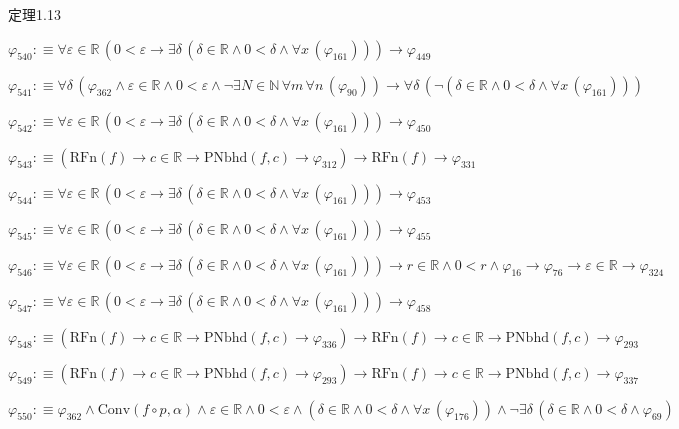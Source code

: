 \begin{fullproof}{定理1.13}
\begin{abbrevlist}
\item $\varphi_{540} :\equiv \forall \varepsilon \in \mathbb{R}\,(0 < \varepsilon \to \exists \delta\,(\delta \in \mathbb{R} \land 0 < \delta \land \forall x\,(\varphi_{161}))) \to \varphi_{449}$
\item $\varphi_{541} :\equiv \forall \delta\,(\varphi_{362} \land \varepsilon \in \mathbb{R} \land 0 < \varepsilon \land \neg \exists N \in \mathbb{N}\,\forall m\,\forall n\,(\varphi_{90})) \to \forall \delta\,(\neg (\delta \in \mathbb{R} \land 0 < \delta \land \forall x\,(\varphi_{161})))$
\item $\varphi_{542} :\equiv \forall \varepsilon \in \mathbb{R}\,(0 < \varepsilon \to \exists \delta\,(\delta \in \mathbb{R} \land 0 < \delta \land \forall x\,(\varphi_{161}))) \to \varphi_{450}$
\item $\varphi_{543} :\equiv (\mathrm{RFn}(f) \to c \in \mathbb{R} \to \mathrm{PNbhd}(f,c) \to \varphi_{312}) \to \mathrm{RFn}(f) \to \varphi_{331}$
\item $\varphi_{544} :\equiv \forall \varepsilon \in \mathbb{R}\,(0 < \varepsilon \to \exists \delta\,(\delta \in \mathbb{R} \land 0 < \delta \land \forall x\,(\varphi_{161}))) \to \varphi_{453}$
\item $\varphi_{545} :\equiv \forall \varepsilon \in \mathbb{R}\,(0 < \varepsilon \to \exists \delta\,(\delta \in \mathbb{R} \land 0 < \delta \land \forall x\,(\varphi_{161}))) \to \varphi_{455}$
\item $\varphi_{546} :\equiv \forall \varepsilon \in \mathbb{R}\,(0 < \varepsilon \to \exists \delta\,(\delta \in \mathbb{R} \land 0 < \delta \land \forall x\,(\varphi_{161}))) \to r \in \mathbb{R} \land 0 < r \land \varphi_{16} \to \varphi_{76} \to \varepsilon \in \mathbb{R} \to \varphi_{324}$
\item $\varphi_{547} :\equiv \forall \varepsilon \in \mathbb{R}\,(0 < \varepsilon \to \exists \delta\,(\delta \in \mathbb{R} \land 0 < \delta \land \forall x\,(\varphi_{161}))) \to \varphi_{458}$
\item $\varphi_{548} :\equiv (\mathrm{RFn}(f) \to c \in \mathbb{R} \to \mathrm{PNbhd}(f,c) \to \varphi_{336}) \to \mathrm{RFn}(f) \to c \in \mathbb{R} \to \mathrm{PNbhd}(f,c) \to \varphi_{293}$
\item $\varphi_{549} :\equiv (\mathrm{RFn}(f) \to c \in \mathbb{R} \to \mathrm{PNbhd}(f,c) \to \varphi_{293}) \to \mathrm{RFn}(f) \to c \in \mathbb{R} \to \mathrm{PNbhd}(f,c) \to \varphi_{337}$
\item $\varphi_{550} :\equiv \varphi_{362} \land \mathrm{Conv}(f \circ p,\alpha) \land \varepsilon \in \mathbb{R} \land 0 < \varepsilon \land (\delta \in \mathbb{R} \land 0 < \delta \land \forall x\,(\varphi_{176})) \land \neg \exists \delta\,(\delta \in \mathbb{R} \land 0 < \delta \land \varphi_{69})$

\end{abbrevlist}
\end{fullproof}
